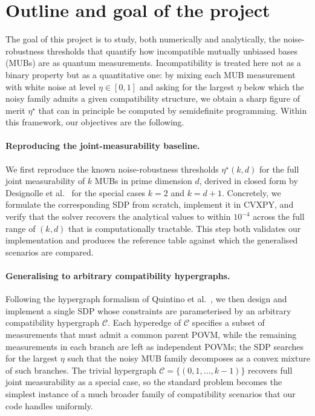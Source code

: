 \documentclass[oneside, a4paper, onecolumn, 11pt]{article}
\theoremstyle{definition}
\theoremstyle{plain}
\theoremstyle{remark}
\begin{document}

\section{Outline and goal of the project}

The goal of this project is to study, both numerically and analytically, the noise-robustness thresholds that quantify how incompatible mutually unbiased bases (MUBs) are as quantum measurements. Incompatibility is treated here not as a binary property but as a quantitative one: by mixing each MUB measurement with white noise at level $\eta \in [0,1]$ and asking for the largest $\eta$ below which the noisy family admits a given compatibility structure, we obtain a sharp figure of merit $\eta^\star$ that can in principle be computed by semidefinite programming. Within this framework, our objectives are the following.

\paragraph{Reproducing the joint-measurability baseline.} We first reproduce the known noise-robustness thresholds $\eta^\star(k,d)$ for the full joint measurability of $k$ MUBs in prime dimension $d$, derived in closed form by Designolle et al.~\cite{Designolle2019} for the special cases $k=2$ and $k=d+1$. Concretely, we formulate the corresponding SDP from scratch, implement it in CVXPY, and verify that the solver recovers the analytical values to within $10^{-4}$ across the full range of $(k,d)$ that is computationally tractable. This step both validates our implementation and produces the reference table against which the generalised scenarios are compared.

\paragraph{Generalising to arbitrary compatibility hypergraphs.} Following the hypergraph formalism of Quintino et al.~\cite{Quintino2019}, we then design and implement a single SDP whose constraints are parameterised by an arbitrary compatibility hypergraph $\mathcal{C}$. Each hyperedge of $\mathcal{C}$ specifies a subset of measurements that must admit a common parent POVM, while the remaining measurements in each branch are left as independent POVMs; the SDP searches for the largest $\eta$ such that the noisy MUB family decomposes as a convex mixture of such branches. The trivial hypergraph $\mathcal{C} = \{(0,1,\dots,k-1)\}$ recovers full joint measurability as a special case, so the standard problem becomes the simplest instance of a much broader family of compatibility scenarios that our code handles uniformly.
\end{document}
